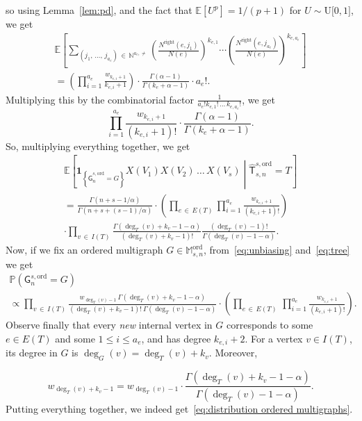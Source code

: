 \documentclass[AHL,Unicode,longabstracts,published]{cedram}
\newcommand{\Ec}[1]{\mathbb{E} \left[#1\right]}
\newcommand{\Pp}[1]{\mathbb{P} \left(#1\right)}
\newcommand{\Ecsq}[2]{\mathbb{E} \left[#1\mathrel{}\middle|\mathrel{}#2\right]}
\newcommand{\intervalle}[4]{\mathopen{#1}#2
\mathclose{}\mathpunct{},#3
\mathclose{#4}}
\newcommand{\intervalleff}[2]{\intervalle{[}{#1}{#2}{]}}
\newcommand{\ind}[1]{\mathbf{1}_{\left\lbrace #1 \right\rbrace}}
\newcommand{\ord}{\mathrm{ord}}
\newcommand{\Rightll}{\mathrm{right}}
\newcommand{\rmU}{\mathrm{U}}
\newcommand{\sG}{\mathsf{G}}
\newcommand{\sT}{\mathsf{T}}
\newcommand{\M}{\mathbb{M}}
\newcommand{\N}{\mathbb{N}}
\begin{document}
so using Lemma~\ref{lem:pd}, and the fact that $\Ec{U^p}=1/(p+1)$ for $U \sim \rmU\intervalleff{0}{1}$, we get
\begin{multline*}
\Ec{ \sum_{\left(j_1,\,\dots,\,j_{a_e}\right)\,\in \,\N^{a_e,\neq}}
\left(\frac{N^{\Rightll}\left(e,j_1\right)}{N(e)} \right)^{k_{e,1}} \cdots \left(\frac{N^{\Rightll}\left(e, j_{a_e}\right)}{N(e)} \right)^{k_{e,a_e}} } \\
= \left(\prod_{i=1}^{a_e} \frac{w_{k_{e,i}+1}}{k_{e,i}+1}\right)\cdot \frac{\Gamma(\alpha-1)}{\Gamma(k_e+\alpha-1)}\cdot a_e!.
\end{multline*}
Multiplying this by the combinatorial factor $ \frac{1}{a_e!k_{e,1}!\,\dots\,k_{e,a_e}!}$, we get
\[
\prod_{i=1}^{a_e} \frac{w_{k_{e,i}+1}}{\left(k_{e,i}+1\right)!}\cdot \frac{\Gamma\left(\alpha-1\right)}{\Gamma\left(k_e+\alpha-1\right)}.
\]
So, multiplying everything together, we get
\begin{multline}\label{eqn:proba of gluing}
\Ecsq{\ind{\widehat{\sG}_{n}^{s,\ord}=G}X(V_1)X(V_2)\,\dots\,X(V_s)}{\widehat{\sT}_{s,n}^{s,\ord}=T} \\
=\frac{\Gamma\left(n+s-1/\alpha\right)}{\Gamma\left(n+s + (s-1)/\alpha\right)}\cdot\left(\prod_{e\,\in\,E(T)}\prod_{i=1}^{a_e} \frac{w_{k_{e,i}+1}}{\left(k_{e,i}+1\right)!}\right)\\
\cdot\prod_{v\,\in\,I(T)}\frac{\Gamma\left(\deg_T(v)+k_v-1-\alpha\right)}{\left(\deg_T(v)+k_v -1\right)!}\frac{\left(\deg_T(v)-1\right)!}{\Gamma\left(\deg_T(v)-1-\alpha\right)}.
\end{multline}
Now, if we fix an ordered multigraph $G\in \M_{s,n}^{\ord}$, from~\eqref{eq:unbiasing} and~\eqref{eq:tree} we get
\begin{multline*}
\Pp{\sG_{n}^{s,\ord}=G} \\
\propto \prod_{v\,\in\,I(T)} \frac{w_{\deg_T(v)-1} \ \Gamma\left(\deg_T(v) + k_v - 1- \alpha\right)}{\left(\deg_T(v) + k_v - 1\right)! \ \Gamma\left(\deg_T(v) - 1 - \alpha\right)} \cdot \left(\prod_{e\,\in\,E(T)}\,\prod_{i=1}^{a_e} \frac{w_{k_{e,i}+1}}{\left(k_{e,i}+1\right)!}\right).
\end{multline*}
Observe finally that every \emph{new} internal vertex in $G$ corresponds to some $e\in E(T)$ and some $1\leq i \leq a_e$, and has degree $k_{e,i}+2$. For a vertex $v\in I(T)$, its degree in $G$ is $\deg_G(v)=\deg_T(v)+k_v$. Moreover,

\[
w_{\deg_T(v)+k_v-1}=w_{\deg_T(v)-1}\cdot\frac{ \Gamma\left(\deg_T(v)+k_v-1-\alpha\right)}{\Gamma\left(\deg_T(v)-1-\alpha\right)}.
\]
Putting everything together, we indeed get~\eqref{eq:distribution ordered multigraphs}.
\end{document}
